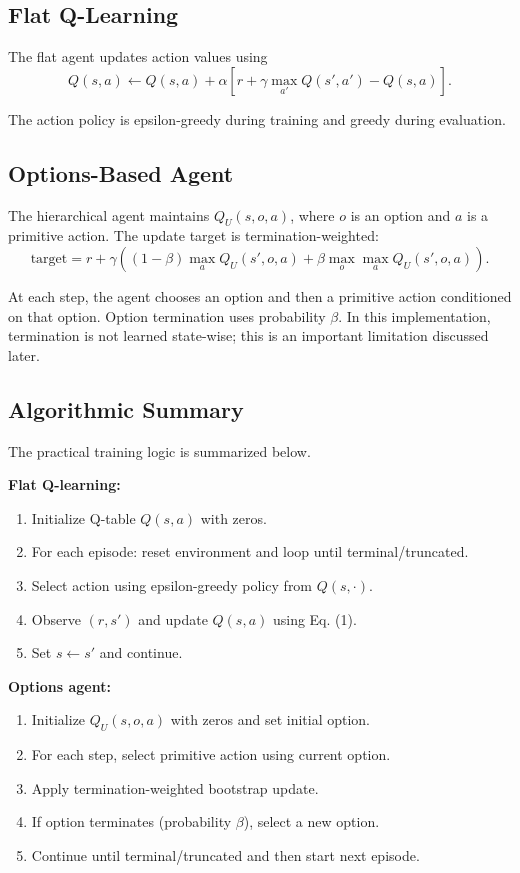 \documentclass[conference]{IEEEtran}
\begin{document}
\subsection{Flat Q-Learning}
The flat agent updates action values using
\begin{equation}
Q(s,a) \leftarrow Q(s,a) + \alpha\left[r + \gamma \max_{a'}Q(s',a') - Q(s,a)\right].
\end{equation}

The action policy is epsilon-greedy during training and greedy during evaluation.

\subsection{Options-Based Agent}
The hierarchical agent maintains $Q_U(s,o,a)$, where $o$ is an option and $a$ is a primitive action. The update target is termination-weighted:
\begin{equation}
\text{target} = r + \gamma\left((1-\beta)\max_a Q_U(s',o,a) + \beta\max_o\max_a Q_U(s',o,a)\right).
\end{equation}

At each step, the agent chooses an option and then a primitive action conditioned on that option. Option termination uses probability $\beta$. In this implementation, termination is not learned state-wise; this is an important limitation discussed later.

\subsection{Algorithmic Summary}
The practical training logic is summarized below.

\textbf{Flat Q-learning:}
\begin{enumerate}
\item Initialize Q-table $Q(s,a)$ with zeros.
\item For each episode: reset environment and loop until terminal/truncated.
\item Select action using epsilon-greedy policy from $Q(s,\cdot)$.
\item Observe $(r,s')$ and update $Q(s,a)$ using Eq. (1).
\item Set $s \leftarrow s'$ and continue.
\end{enumerate}

\textbf{Options agent:}
\begin{enumerate}
\item Initialize $Q_U(s,o,a)$ with zeros and set initial option.
\item For each step, select primitive action using current option.
\item Apply termination-weighted bootstrap update.
\item If option terminates (probability $\beta$), select a new option.
\item Continue until terminal/truncated and then start next episode.
\end{enumerate}
\end{document}

